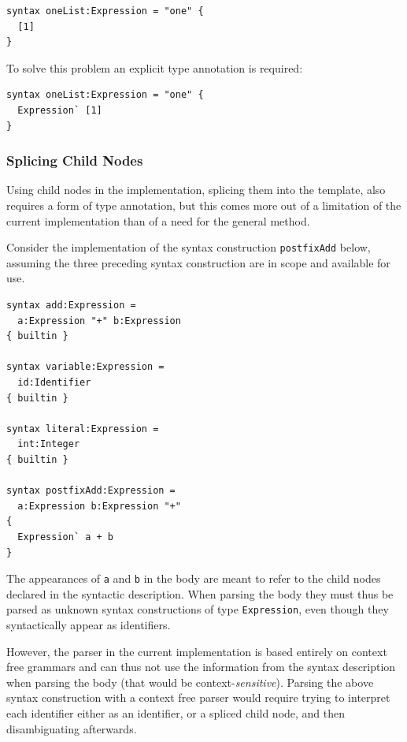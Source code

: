 \documentclass{kththesis}
\begin{document}
\begin{verbatim}
syntax oneList:Expression = "one" {
  [1]
}
\end{verbatim}

To solve this problem an explicit type annotation is required:

\begin{verbatim}
syntax oneList:Expression = "one" {
  Expression` [1]
}
\end{verbatim}

\subsubsection{Splicing Child Nodes}

Using child nodes in the implementation, splicing them into the template, also requires a form of type annotation, but this comes more out of a limitation of the current implementation than of a need for the general method.

Consider the implementation of the syntax construction \texttt{postfixAdd} below, assuming the three preceding syntax construction are in scope and available for use.

\begin{verbatim}
syntax add:Expression =
  a:Expression "+" b:Expression
{ builtin }

syntax variable:Expression =
  id:Identifier
{ builtin }

syntax literal:Expression =
  int:Integer
{ builtin }

syntax postfixAdd:Expression =
  a:Expression b:Expression "+"
{
  Expression` a + b
}
\end{verbatim}

The appearances of \texttt{a} and \texttt{b} in the body are meant to refer to the child nodes declared in the syntactic description. When parsing the body they must thus be parsed as unknown syntax constructions of type \texttt{Expression}, even though they syntactically appear as identifiers.

However, the parser in the current implementation is based entirely on context free grammars and can thus not use the information from the syntax description when parsing the body (that would be context-\emph{sensitive}). Parsing the above syntax construction with a context free parser would require trying to interpret each identifier either as an identifier, or a spliced child node, and then disambiguating afterwards.
\end{document}
